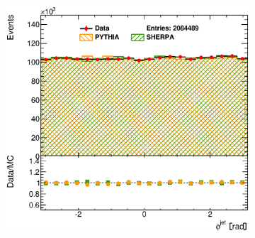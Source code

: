 \documentclass[12pt, twoside]{article}
\numberwithin{equation}{section}
\numberwithin{figure}{section}
\newenvironment{changemargin}[2]{%
\begin{list}{}{%
\setlength{\topsep}{0pt}%
\setlength{\leftmargin}{#1}%
\setlength{\rightmargin}{#2}%
\setlength{\listparindent}{\parindent}%
\setlength{\itemindent}{\parindent}%
\setlength{\parsep}{\parskip}%
}%
\item[]}{\end{list}}
\begin{document}
\begin{figure}
\begin{changemargin}{-1.0cm}{-0.75cm}
\begin{changemargin}{-0.75cm}{-1.0cm}
\begin{subfigure}[b]{0.37\textwidth}
            \subcaption{}
            \label{fig:MUReweightRapidityJet}
        \end{subfigure}
        \begin{subfigure}[b]{0.37\textwidth}
            \includegraphics[width=\textwidth]{./images/Results(MUReweight)/DEF-106.eps}
            \subcaption{}
            \label{fig:MUReweightPhiJet}
        \end{subfigure}


\end{changemargin}
\end{changemargin}
\end{figure}
\end{document}
